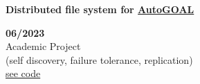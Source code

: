 \begin{minipage}{0.8\textwidth}
    \parbox{0.8\linewidth}{\textbf{Distributed file system for \href{https://autogoal.github.io/}{AutoGOAL}}}\hfill \textbf{06/2023} \\
    Academic Project\\
    (self discovery, failure tolerance, replication)\\
    \href{https://github.com/geeksLabTech/kade-drive}{see code}\\
\end{minipage} \hfill {}\\\\
